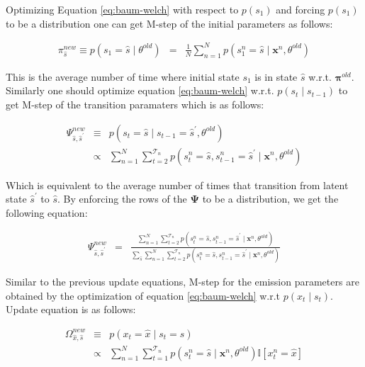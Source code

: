 Optimizing Equation \ref{eq:baum-welch} with respect to $p\left(s_1\right)$ and forcing $p\left(s_1\right)$ to be a distribution one can get M-step of the initial parameters as follows:

\begin{eqnarray}
    \pi_{\hat{s}}^{n e w} \equiv p\left(s_{1}=\hat{s}\mid \theta^{old}\right)&=&\frac{1}{N} \sum_{n=1}^{N} p\left(s_{1}^{n}=\hat{s} \mid \boldsymbol{x}^{n}, \theta^{old}\right)
\end{eqnarray}

This is the average number of time where initial state $s_1$ is in state $\hat{s}$ w.r.t. $\boldsymbol{\pi}^{old}$. Similarly one should optimize equation \ref{eq:baum-welch} w.r.t. $p\left(s_t\mid s_{t-1}\right)$ to get M-step of the transition paramaters which is as follows:

\begin{eqnarray}
    \Psi_{\hat{s},\hat{s}^{\prime}}^{n e w} &\equiv& p\left(s_{t}=\hat{s} \mid s_{t-1}=\hat{s}^{\prime}, \theta^{old}\right) \\
    &\propto& \sum_{n=1}^{N} \sum_{t=2}^{\mathcal{T}_{n}} p\left(s_{t}^n=\hat{s}, s_{t-1}^n=\hat{s}^{\prime} \mid \boldsymbol{x}^{n}, \theta^{old}\right)
\end{eqnarray}

Which is equivalent to the average number of times that transition from latent state $\hat{s}^{\prime}$ to $\hat{s}$. By enforcing the rows of the $\boldsymbol{\Psi}$ to be a distribution, we get the following equation:

\begin{eqnarray}
    \Psi_{\hat{s},\hat{s}^{\prime}}^{n e w} &=&\frac{\sum_{n=1}^{N} \sum_{t=2}^{\mathcal{T}_{n}} p\left(s_{t}^n=\hat{s}, s_{t-1}^n=\hat{s}^{\prime} \mid \boldsymbol{x}^{n},\theta^{old}\right)} {\sum_{\hat{s}} \sum_{n=1}^{N} \sum_{t=2}^{\mathcal{T}_{n}} p\left(s_{t}^n=\hat{s}, s_{t-1}^n=\hat{s}^{\prime} \mid \boldsymbol{x}^{n}, \theta^{old}\right)}
\end{eqnarray}

Similar to the previous update equations, M-step for the emission parameters are obtained by the optimization of equation \ref{eq:baum-welch} w.r.t $p\left(x_t\mid s_{t}\right)$. Update equation is as follows:

\begin{eqnarray}
    \Omega_{\hat{x}, \hat{s}}^{new} &\equiv& p\left(x_{t}=\hat{x} \mid s_{t}=\hat{s}\right) \\
    &\propto& \sum_{n=1}^{N} \sum_{t=1}^{\mathcal{T}_{n}} p\left(s_{t}^n=\hat{s} \mid \boldsymbol{x}^{n}, \theta^{old}\right) \mathbb{I}\left[x_{t}^{n}=\hat{x}\right]
\end{eqnarray}

